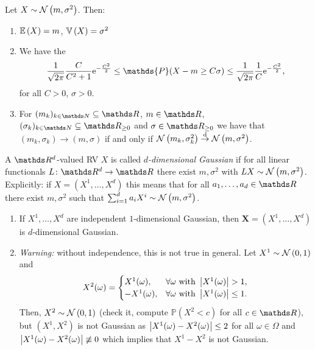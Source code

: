 \begin{prop}
Let $X\sim \mathcal{N}\left(m,\sigma^2\right)$.
Then:
\begin{enumerate}[label=(\alph*)]
\item $\mathbb{E}\left(X \right) =m$, $\mathbb{V}\left(X\right) = \sigma^2$
\item We have the 
	\begin{align*}
	\frac{1}{\sqrt{2\pi}} \frac{C}{C^2+1}\e^{-\frac{C^2}{2}}
	\leq
	\mathds{P}(X-m\geq C \sigma)
	\leq
	\frac{1}{\sqrt{2\pi}} \frac{1}{C}\e^{-\frac{C^2}{2}},
	\end{align*}
	for all $C>0$, $\sigma>0$.
\item For $(m_k)_{k\in \N}\subseteq \R$, $m\in \R$,
	$(\sigma_k)_{k\in \N}\subseteq \R_{\geq 0}$ and $\sigma\in \R_{\geq 0}$
	we have that
	$(m_k, \sigma_k) \to (m, \sigma)$
	if and only if
	$\mathcal{N}\left(m_k,\sigma_k^2\right) \overset{\text{d}}{\to}  \mathcal{N}\left(m,\sigma^2\right)$.
\end{enumerate}
\end{prop}

\begin{defi}
A $\Rd$-valued RV $X$ is called \emph{$d$-dimensional Gaussian} if for all linear functionals $L\colon \Rd\to \R$ there exist $m,\sigma^2$ with $LX\sim \mathcal{N}\left(m,\sigma^2\right)$.
Explicitly: if $X=(X^1,\dots,X^d)$ this means that for all $a_1,\dots,a_d \in \R$ there exist $m,\sigma^2$ such that $\sum_{i=1}^d a_i X^i \sim \mathcal{N}\left(m,\sigma^2\right)$.
\end{defi}

\begin{bsp}
\begin{enumerate}[label=(\alph*)]
\item If $X^1,\dots,X^d$ are independent $1$-dimensional Gaussian, then 
$\textbf{X}=(X^1,\dots,X^d)$ is $d$-dimensional Gaussian.
\item \emph{Warning:} without independence, this is not true in general.
Let $X^1\sim \mathcal{N}\left(0,1\right)$ and
\begin{align*}
X^2(\omega)=\begin{cases}
X^1(\omega),~~&\forall \omega \text{ with } \left\vert X^1(\omega)\right\vert>1,\\
-X^1(\omega),&\forall \omega \text{ with } \left\vert X^1(\omega)\right\vert\leq 1.
\end{cases}
\end{align*}
Then, $X^2\sim \mathcal{N}\left(0,1\right)$ (check it, compute $\mathds{P}(X^2<c)$ for all $c\in \R$), but $(X^1,X^2)$ is not Gaussian as
$\left\vert X^1(\omega)-X^2(\omega)\right\vert\leq 2$ for all $\omega \in \Omega$ and
$\left\vert X^1(\omega)-X^2(\omega)\right\vert\not \equiv 0$ which implies that $X^1-X^2$ is not Gaussian.
\end{enumerate}
\end{bsp}

